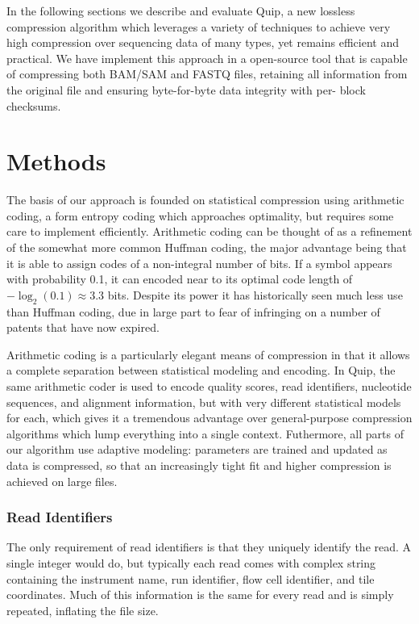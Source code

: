 \documentclass[twocolumn]{article}
\begin{document}

In the following sections we describe and evaluate Quip, a new lossless
compression algorithm which leverages a variety of techniques to achieve very
high compression over sequencing data of many types, yet remains efficient and
practical. We have implement this approach in a open-source tool that is
capable of compressing both BAM/SAM and FASTQ files, retaining all information
from the original file and ensuring byte-for-byte data integrity with per-
block checksums.



\section{Methods}

The basis of our approach is founded on statistical compression using
arithmetic coding, a form entropy coding which approaches optimality, but
requires some care to implement efficiently. Arithmetic coding can be thought
of as a refinement of the somewhat more common Huffman coding, the major
advantage being that it is able to assign codes of a non-integral number of
bits. If a symbol appears with probability 0.1, it can encoded near to its
optimal code length of $-\log_2(0.1) \approx 3.3$ bits. Despite its power it
has historically seen much less use than Huffman coding, due in large part to
fear of infringing on a number of patents that have now expired.

Arithmetic coding is a particularly elegant means of compression in that it
allows a complete separation between statistical modeling and encoding. In
Quip, the same arithmetic coder is used to encode quality scores, read
identifiers, nucleotide sequences, and alignment information, but with very
different statistical models for each, which gives it a tremendous advantage
over general-purpose compression algorithms which lump everything into a
single context. Futhermore, all parts of our algorithm use adaptive modeling:
parameters are trained and updated as data is compressed, so that an
increasingly tight fit and higher compression is achieved on large files.


\subsubsection{Read Identifiers}

The only requirement of read identifiers is that they uniquely identify the
read. A single integer would do, but typically each read comes with complex
string containing the instrument name, run identifier, flow cell identifier,
and tile coordinates. Much of this information is the same for every read and
is simply repeated, inflating the file size.
\end{document}
